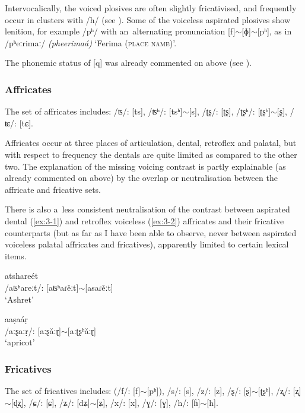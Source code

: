 Intervocalically, the voiced plosives are often slightly fricativised, and frequently occur in clusters with /h/ (see ). Some of the voiceless aspirated plosives show lenition, for example /pʰ/ with an~alternating pronunciation [f]$\sim$[ɸ]$\sim$[pʰ], as in /pʰeːrimaː/ \textit{(pheerimaá)} `Ferima (\textsc{place name)}'. 


The phonemic status of [q] was already commented on above (see ).


\subsubsection*{Affricates}

The set of affricates includes: /ʦ/: [ts], /ʦʰ/: [tsʰ]$\sim$[s], /ʈʂ/: [ʈʂ], /ʈʂʰ/: [ʈʂʰ]$\sim$[ʂ], /ʨ/: [tɕ].


Affricates occur at three places of articulation, dental, retroflex and palatal, but with respect to frequency the dentals are quite limited as compared to the other two. The explanation of the missing voicing contrast is partly explainable (as already commented on above) by the overlap or neutralisation between the affricate and fricative sets. 


There is also a~less consistent neutralisation of the contrast between aspirated dental (\ref{ex:3-1}) and retroflex voiceless (\ref{ex:3-2}) affricates and their fricative counterparts (but as far as I have been able to observe, never between aspirated voiceless palatal affricates and fricatives), apparently limited to certain lexical items. 

\begin{exe}
\ex
\label{ex:3-1}
\gll atshareét \\
 /aʦʰareːt/: [aʦʰaɾěːt]$\sim$[asaɾěːt] \\
\glt `Ashret'

\ex
\label{ex:3-2}
\gll aaṣaáṛ \\
/aːʂaːṛ/: [aːʂǎːɽ]$\sim$[aːʈʂʰǎːɽ] \\
\glt `apricot'
\end{exe}

\subsubsection*{Fricatives}

The set of fricatives includes: (/f/: [f]$\sim$[pʰ]), /s/: [s], /z/: [z], /ʂ/: [ʂ]$\sim$[ʈʂʰ], /ʐ/: [ʐ]$\sim$[ɖʐ], /ɕ/: [ɕ], /ʑ/: [dʑ]$\sim$[ʑ], /x/: [x], /ɣ/: [ɣ], /h/: [ɦ]$\sim$[h].


